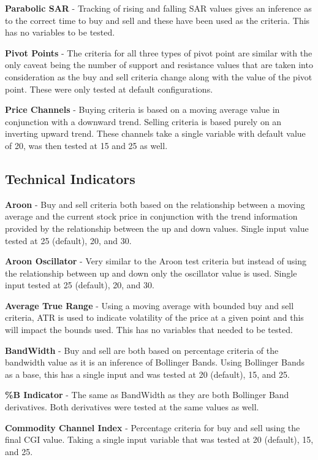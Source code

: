 \documentclass[conference]{IEEEtran}
\begin{document}
\textbf{Parabolic SAR} - Tracking of rising and falling SAR values gives an inference as to the correct time to buy and sell and these have been used as the criteria. This has no variables to be tested.

\textbf{Pivot Points} - The criteria for all three types of pivot point are similar with the only caveat being the number of support and resistance values that are taken into consideration as the buy and sell criteria change along with the value of the pivot point. These were only tested at default configurations.

\textbf{Price Channels} - Buying criteria is based on a moving average value in conjunction with a downward trend. Selling criteria is based purely on an inverting upward trend. These channels take a single variable with default value of 20, was then tested at 15 and 25 as well.

\subsection{Technical Indicators}

\textbf{Aroon} - Buy and sell criteria both based on the relationship between a moving average and the current stock price in conjunction with the trend information provided by the relationship between the up and down values. Single input value tested at 25 (default), 20, and 30.

\textbf{Aroon Oscillator} - Very similar to the Aroon test criteria but instead of using the relationship between up and down only the oscillator value is used. Single input tested at 25 (default), 20, and 30.

\textbf{Average True Range} - Using a moving average with bounded buy and sell criteria, ATR is used to indicate volatility of the price at a given point and this will impact the bounds used. This has no variables that needed to be tested. 

\textbf{BandWidth} - Buy and sell are both based on percentage criteria of the bandwidth value as it is an inference of Bollinger Bands. Using Bollinger Bands as a base, this has a single input and was tested at 20 (default), 15, and 25.

\textbf{\%B Indicator} - The same as BandWidth as they are both Bollinger Band derivatives. Both derivatives were tested at the same values as well.

\textbf{Commodity Channel Index} - Percentage criteria for buy and sell using the final CGI value. Taking a single input variable that was tested at 20 (default), 15, and 25.
\end{document}

